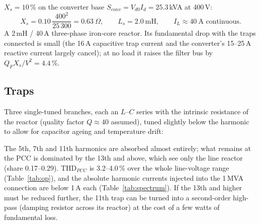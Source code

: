 \documentclass[11pt,a4paper]{article}
\newcommand{\Vdo}{V_{d0}}
\newcommand{\Id}{I_d}
\begin{document}
$X_s = 10$\,\% on the converter base $S_{conv} = \Vdo\Id = 25.3$\,kVA at 400\,V:
\[
X_s = 0.10\,\frac{400^2}{25\,300} = 0.63\ \Omega, \qquad L_s = 2.0\ \text{mH}, \qquad I_{L} \approx 40\ \text{A continuous}.
\]
A 2\,mH / 40\,A three-phase iron-core reactor. Its fundamental drop with the traps connected is small (the 16\,A capacitive trap current and the converter's 15--25\,A reactive current largely cancel); at no load it raises the filter bus by $Q_F X_s/V^2 = 4.4$\,\%.

\subsection{Traps}

Three single-tuned branches, each an $L$--$C$ series with the intrinsic resistance of the reactor (quality factor $Q \approx 40$ assumed), tuned slightly below the harmonic to allow for capacitor ageing and temperature drift:

\begin{table}[h]
\centering

\caption{Trap branches, star-equivalent values at 400\,V ($X_C = V^2/Q_C$, $C = 1/\omega X_C$, $L = X_C/(h_t^2\omega)$, $R = h_t\omega L/Q$). $I_{C1}$ is the fundamental current per phase.}
\label{tab:traps}
\end{table}

\begin{table}[h]
\centering
\small

\caption{Filter impedance, grid-path impedance and sharing factor, Eq.~\eqref{eq:share}.}
\label{tab:share}
\end{table}

\begin{table}[h]
\centering

\caption{Worst-case spectrum (440\,V, 1100\,A, $\alpha = 36^\circ$): converter current, current at the PCC relative to $I_1 = 36.5$\,A, and in amperes. THD 28.4\,\% $\rightarrow$ 4.0\,\%.}
\label{tab:spectrum}
\end{table}

The 5th, 7th and 11th harmonics are absorbed almost entirely; what remains at the PCC is dominated by the 13th and above, which see only the line reactor (share 0.17--0.29). THD$_{PCC}$ is 3.2--4.0\,\% over the whole line-voltage range (Table~\ref{tab:op}), and the absolute harmonic currents injected into the 1\,MVA connection are below 1\,A each (Table~\ref{tab:spectrum}). If the 13th and higher must be reduced further, the 11th trap can be turned into a second-order high-pass (damping resistor across its reactor) at the cost of a few watts of fundamental loss.
\end{document}
